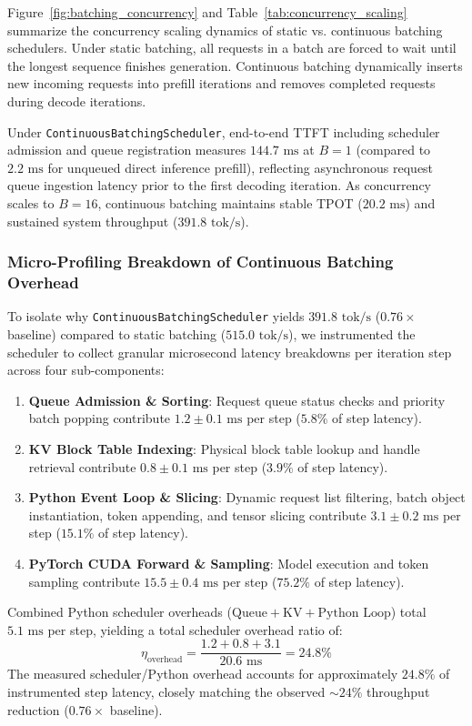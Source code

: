 Figure~\ref{fig:batching_concurrency} and Table~\ref{tab:concurrency_scaling} summarize the concurrency scaling dynamics of static vs. continuous batching schedulers. Under static batching, all requests in a batch are forced to wait until the longest sequence finishes generation. Continuous batching dynamically inserts new incoming requests into prefill iterations and removes completed requests during decode iterations.

Under \texttt{ContinuousBatchingScheduler}, end-to-end TTFT including scheduler admission and queue registration measures $144.7\text{ ms}$ at $B=1$ (compared to $2.2\text{ ms}$ for unqueued direct inference prefill), reflecting asynchronous request queue ingestion latency prior to the first decoding iteration. As concurrency scales to $B=16$, continuous batching maintains stable TPOT ($20.2\text{ ms}$) and sustained system throughput ($391.8\text{ tok/s}$).

\subsubsection{Micro-Profiling Breakdown of Continuous Batching Overhead}
\label{sec:eval_cb_causal}

To isolate why \texttt{ContinuousBatchingScheduler} yields $391.8\text{ tok/s}$ ($0.76\times$ baseline) compared to static batching ($515.0\text{ tok/s}$), we instrumented the scheduler to collect granular microsecond latency breakdowns per iteration step across four sub-components:
\begin{enumerate}
    \item \textbf{Queue Admission \& Sorting}: Request queue status checks and priority batch popping contribute $1.2 \pm 0.1\text{ ms}$ per step ($5.8\%$ of step latency).
    \item \textbf{KV Block Table Indexing}: Physical block table lookup and handle retrieval contribute $0.8 \pm 0.1\text{ ms}$ per step ($3.9\%$ of step latency).
    \item \textbf{Python Event Loop \& Slicing}: Dynamic request list filtering, batch object instantiation, token appending, and tensor slicing contribute $3.1 \pm 0.2\text{ ms}$ per step ($15.1\%$ of step latency).
    \item \textbf{PyTorch CUDA Forward \& Sampling}: Model execution and token sampling contribute $15.5 \pm 0.4\text{ ms}$ per step ($75.2\%$ of step latency).
\end{enumerate}

Combined Python scheduler overheads ($\text{Queue} + \text{KV} + \text{Python Loop}$) total $5.1\text{ ms}$ per step, yielding a total scheduler overhead ratio of:
\begin{equation}
    \eta_{\text{overhead}} = \frac{1.2 + 0.8 + 3.1}{20.6\text{ ms}} = 24.8\%
\end{equation}
The measured scheduler/Python overhead accounts for approximately $24.8\%$ of instrumented step latency, closely matching the observed $\sim 24\%$ throughput reduction ($0.76\times$ baseline).

